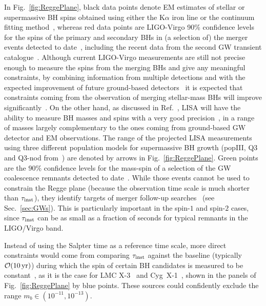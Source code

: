 \documentclass[11pt]{article}
\numberwithin{equation}{section} %
\begin{document}
In Fig.~\ref{fig:ReggePlane}, black data points denote EM
estimates of stellar or supermassive BH spins obtained using either the
K$\alpha$ iron line or the continuum fitting
method~\cite{Brenneman:2011wz,Middleton:2015osa}, whereas red data points are LIGO-Virgo 90\% confidence levels for the 
spins of the primary and secondary BHs in (a selection of) the merger events detected to 
date~\cite{LIGOScientific:2018mvr,LIGOScientific:2020stg,Abbott:2020khf,Abbott:2020tfl}, including the recent data from the second GW transient catalogue~\cite{Abbott:2020niy}. 
Although current LIGO-Virgo measurements are still not precise enough to measure the 
spins from the merging BHs and give any meaningful constraints, by combining information from multiple detections and 
with the expected improvement of future ground-based detectors~\cite{Sathyaprakash:2019yqt} it is expected that 
constraints coming from the observation of merging stellar-mass BHs will improve significantly~\cite{Arvanitaki:2016qwi, 
Baryakhtar:2017ngi,Ng:2019jsx,Ng:2020ruv}. On the other hand, as discussed in Ref.~\cite{Brito:2017zvb}, LISA will have 
the ability 
to measure BH masses and spins with a very good precision~\cite{Klein:2015hvg}, in a range of masses largely 
complementary to the ones coming from ground-based GW detector and EM observations. The range of the projected LISA 
measurements using three different population models for supermassive BH growth (popIII, Q3 and Q3-nod 
from~\cite{Klein:2015hvg}) are denoted by arrows in Fig.~\ref{fig:ReggePlane}. 
%
Green points are the $90\%$ confidence levels for the mass-spin of a selection of the GW coalescence 
remnants detected to 
date~\cite{LIGOScientific:2018mvr,LIGOScientific:2020stg,Abbott:2020khf,Abbott:2020tfl,Abbott:2020niy}. 
While those events cannot be used to constrain the Regge plane (because the 
observation time scale is much shorter than $\tau_{\rm inst}$), they identify targets of merger follow-up 
searches~\cite{Arvanitaki:2014wva,Arvanitaki:2016qwi,Baryakhtar:2017ngi,Isi:2018pzk,Ghosh:2018gaw} (see 
Sec.~\ref{sec:GWs}). This is particularly important in the spin-$1$ and spin-$2$ cases, since $\tau_{\rm inst}$ can be 
as small as a fraction of seconds for typical remnants in the LIGO/Virgo band.
%

Instead of using the Salpter time as a reference time scale, more direct constraints would come from comparing 
$\tau_{\rm inst}$ 
against the baseline (typically ${\cal O}(10\,{\rm yr})$) during which the spin of certain BH candidates is 
measured to be constant~\cite{Cardoso:2018tly}, as it is the case for LMC X-3~\cite{Steiner:2010kd} and 
Cyg~X-1~\cite{Gou:2009ks}, shown in the panels of Fig.~\ref{fig:ReggePlane} by blue points. 
These sources could confidently exclude the range $m_b\in(10^{-11},10^{-13})$.
\end{document}
